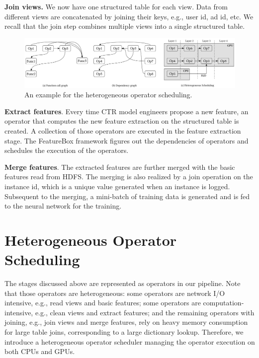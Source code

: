 \documentclass[sigconf]{acmart}
\begin{document}
\textbf{Join views.} 
We now have one structured table for each view. 
Data from different views are concatenated by joining their keys, e.g., user id, ad id, etc. 
We recall that the join step combines multiple views into a single structured table.

\begin{figure}[htp]
\includegraphics[width=\textwidth]{figs/dag}
\caption{An example for the heterogeneous operator scheduling.}
\label{fig:dag}%
\end{figure}

\textbf{Extract features}.
Every time CTR model engineers propose a new feature, an operator that computes the new feature extraction on the structured table is created. 
A collection of those operators are executed in the feature extraction stage. 
The FeatureBox framework figures out the dependencies of operators and schedules the execution of the operators.



\textbf{Merge features}. 
The extracted features are further merged with the basic features read from HDFS. The merging is also realized by a join operation on the instance id, which is a unique value generated when an instance is logged. 
Subsequent to the merging, a mini-batch of training data is generated and is fed to the neural network for the training.



\section{Heterogeneous Operator Scheduling}
The stages discussed above are represented as operators in our pipeline. Note that those operators are heterogeneous: some operators are network I/O intensive, e.g., read views and basic features; some operators are computation-intensive, e.g., clean views and extract features; and the remaining operators with joining, e.g., join views and merge features, rely on heavy memory consumption for large table joins, corresponding to a large dictionary lookup. Therefore, we introduce a heterogeneous operator scheduler managing the operator execution on both CPUs and GPUs. 
\end{document}
